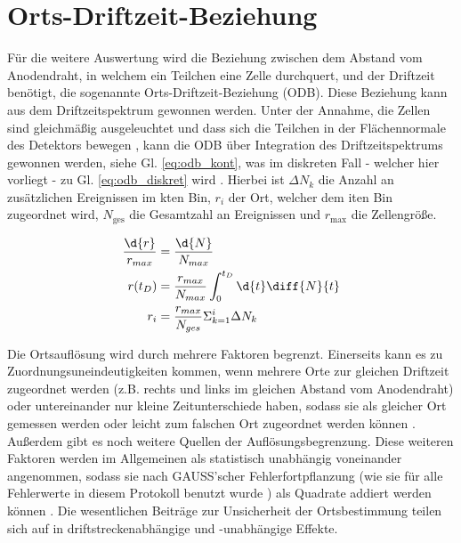 \chapter{Orts-Driftzeit-Beziehung}

Für die weitere Auswertung wird die Beziehung zwischen dem Abstand vom Anodendraht, in welchem ein Teilchen eine Zelle durchquert, und der Driftzeit benötigt, die sogenannte Orts-Driftzeit-Beziehung (ODB). Diese Beziehung kann aus dem Driftzeitspektrum gewonnen werden. Unter der Annahme, die Zellen sind gleichmäßig ausgeleuchtet und dass sich die Teilchen in der Flächennormale des Detektors bewegen \cite[36,38]{hammanndiplom}, kann die ODB über Integration des Driftzeitspektrums gewonnen werden, siehe Gl. \eqref{eq:odb_kont}, was im diskreten Fall - welcher hier vorliegt - zu Gl. \eqref{eq:odb_diskret} wird \cite[247-249]{kolanoskiwermerdetektoren}. Hierbei ist $\Delta N_k$ die Anzahl an zusätzlichen Ereignissen im kten Bin, $r_i$ der Ort, welcher dem iten Bin zugeordnet wird, $N_\text{ges}$ die Gesamtzahl an Ereignissen und $r_\text{max}$ die Zellengröße.

\begin{align}
	\frac{\d{r}}{r_{max}} &= \frac{\d{N}}{N_{max}} \\
	r(t_D) &= \frac{r_{max}}{N_{max}} \int_0^{t_D} \d{t} \diff{N}{t} \label{eq:odb_kont} \\
	r_i &= \frac{r_{max}}{N_{ges}} \Sigma_{k=1}^i \Delta N_k\label{eq:odb_diskret}
\end{align}

Die Ortsauflösung wird durch mehrere Faktoren begrenzt. Einerseits kann es zu Zuordnungsuneindeutigkeiten kommen, wenn mehrere Orte zur gleichen Driftzeit zugeordnet werden (z.B. rechts und links im gleichen Abstand vom Anodendraht) oder untereinander nur kleine Zeitunterschiede haben, sodass sie als gleicher Ort gemessen werden oder leicht zum falschen Ort zugeordnet werden können \cite[18]{hammanndiplom}.
Außerdem gibt es noch weitere Quellen der Auflösungsbegrenzung. Diese weiteren Faktoren werden im Allgemeinen als statistisch unabhängig voneinander angenommen, sodass sie nach \uppercase{Gauß}'scher Fehlerfortpflanzung (wie sie für alle Fehlerwerte in diesem Protokoll benutzt wurde \cite[8-9]{gerthsen}) als Quadrate addiert werden können \cite[250]{kolanoskiwermerdetektoren}. Die wesentlichen Beiträge zur Unsicherheit der Ortsbestimmung teilen sich auf in driftstreckenabhängige und -unabhängige Effekte.

